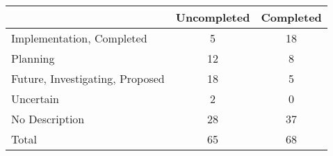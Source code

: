 \begin{tabular}{l*{1}{cc}}
 &Uncompleted &Completed  \\
\hline 
Implementation, Completed &          5 &         18  \\
Planning &         12 &          8  \\
Future, Investigating, Proposed &         18 &          5  \\
Uncertain &          2 &          0  \\
No Description &         28 &         37  \\
\hline Total &         65 &         68  \\
\hline
\end{tabular}